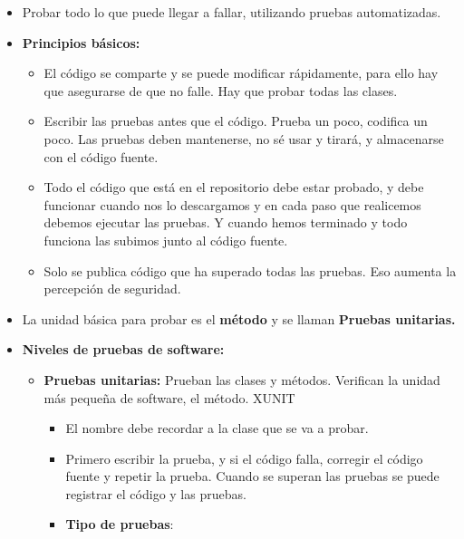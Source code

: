 \documentclass[12pt, twoside, openright]{report} %
\begin{document}
\begin{itemize}
\item Probar todo lo que puede llegar a fallar, utilizando pruebas
  automatizadas.
  
\item \textbf{Principios básicos:}
  

  \begin{itemize}
  \item El código se comparte y se puede modificar rápidamente, para ello
    hay que asegurarse de que no falle. Hay que probar todas las clases.
    
  \item Escribir las pruebas antes que el código. Prueba un poco, codifica
    un poco. Las pruebas deben mantenerse, no sé usar y tirará, y
    almacenarse con el código fuente.
    
  \item Todo el código que está en el repositorio debe estar probado, y debe
    funcionar cuando nos lo descargamos y en cada paso que realicemos
    debemos ejecutar las pruebas. Y cuando hemos terminado y todo
    funciona las subimos junto al código fuente.
    
  \item Solo se publica código que ha superado todas las pruebas. Eso
    aumenta la percepción de seguridad.
    
  \end{itemize}
\item La unidad básica para probar es el \textbf{método} y se llaman
  \textbf{Pruebas unitarias.}
  
\item \textbf{Niveles de pruebas de software:}
  

  \begin{itemize}
  \item \textbf{Pruebas unitarias:} Prueban las clases y métodos. Verifican
    la unidad más pequeña de software, el método. XUNIT
    

    \begin{itemize}
    \item El nombre debe recordar a la clase que se va a probar.
      
    \item Primero escribir la prueba, y si el código falla, corregir el
      código fuente y repetir la prueba. Cuando se superan las pruebas
      se puede registrar el código y las pruebas.
      
    \item \textbf{Tipo de pruebas}:
      


\end{itemize}
\end{itemize}
\end{itemize}
\end{document}
